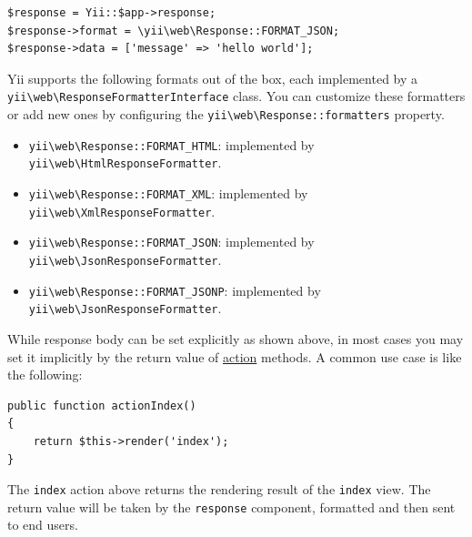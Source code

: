 \lstset{language=php}\begin{lstlisting}
$response = Yii::$app->response;
$response->format = \yii\web\Response::FORMAT_JSON;
$response->data = ['message' => 'hello world'];
\end{lstlisting}
Yii supports the following formats out of the box, each implemented by a \texttt{yii{\allowbreak{}\textbackslash}web{\allowbreak{}\textbackslash}ResponseFormatterInterface} class.
You can customize these formatters or add new ones by configuring the \texttt{yii{\allowbreak{}\textbackslash}web{\allowbreak{}\textbackslash}Response\allowbreak{}::\allowbreak{}formatters} property.

\begin{itemize}
\item \texttt{yii{\allowbreak{}\textbackslash}web{\allowbreak{}\textbackslash}Response\allowbreak{}::\allowbreak{}FORMAT\_HTML}: implemented by \texttt{yii{\allowbreak{}\textbackslash}web{\allowbreak{}\textbackslash}HtmlResponseFormatter}.
\item \texttt{yii{\allowbreak{}\textbackslash}web{\allowbreak{}\textbackslash}Response\allowbreak{}::\allowbreak{}FORMAT\_XML}: implemented by \texttt{yii{\allowbreak{}\textbackslash}web{\allowbreak{}\textbackslash}XmlResponseFormatter}.
\item \texttt{yii{\allowbreak{}\textbackslash}web{\allowbreak{}\textbackslash}Response\allowbreak{}::\allowbreak{}FORMAT\_JSON}: implemented by \texttt{yii{\allowbreak{}\textbackslash}web{\allowbreak{}\textbackslash}JsonResponseFormatter}.
\item \texttt{yii{\allowbreak{}\textbackslash}web{\allowbreak{}\textbackslash}Response\allowbreak{}::\allowbreak{}FORMAT\_JSONP}: implemented by \texttt{yii{\allowbreak{}\textbackslash}web{\allowbreak{}\textbackslash}JsonResponseFormatter}.
\end{itemize}
While response body can be set explicitly as shown above, in most cases you may set it implicitly by the return value
of \hyperref[structure-controllers.md]{action} methods. A common use case is like the following:

\lstset{language=php}\begin{lstlisting}
public function actionIndex()
{
    return $this->render('index');
}
\end{lstlisting}
The \lstinline|index| action above returns the rendering result of the \lstinline|index| view. The return value will be taken
by the \lstinline|response| component, formatted and then sent to end users.

